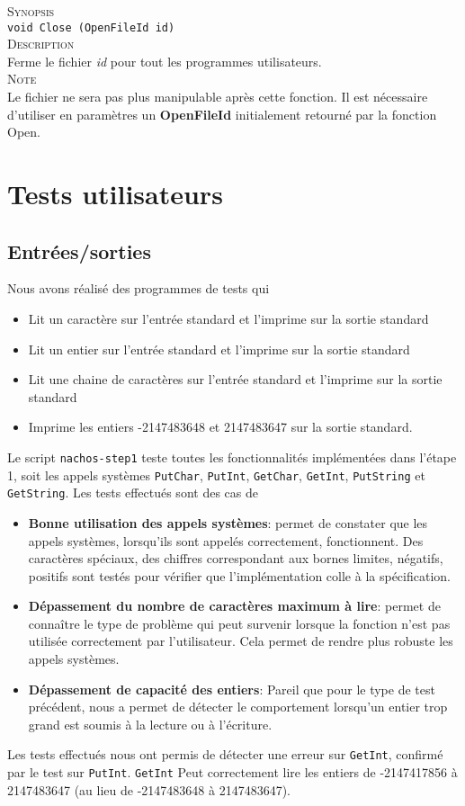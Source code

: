 \documentclass{report}
\begin{document}
\textsc{Synopsis}\\	
	\texttt{void Close (OpenFileId id)}\\
	
\textsc{Description}\\
	Ferme le fichier \textit{id} pour tout les programmes utilisateurs.  \\	
	
\textsc{Note}\\
	Le fichier ne sera pas plus manipulable après cette fonction. Il est nécessaire d'utiliser en paramètres un \textbf{OpenFileId} initialement retourné par la fonction Open.\\	
	
	
\section*{Tests utilisateurs}
\subsection*{Entrées/sorties}
Nous avons réalisé des programmes de tests qui
\begin{itemize}
 \item Lit un caractère sur l'entrée standard et l'imprime sur la sortie standard
 \item Lit un entier sur l'entrée standard et l'imprime sur la sortie standard
 \item Lit une chaine de caractères sur l'entrée standard et l'imprime sur la sortie
 standard
 \item Imprime les entiers -2147483648 et 2147483647 sur la sortie standard.
\end{itemize}
Le script \texttt{nachos-step1} teste toutes les fonctionnalités implémentées dans l'étape 1, soit les appels systèmes \texttt{PutChar}, \texttt{PutInt}, \texttt{GetChar}, \texttt{GetInt}, \texttt{PutString} et \texttt{GetString}.
Les tests effectués sont des cas de
\begin{itemize}
 \item \textbf{Bonne utilisation des appels systèmes}: permet de constater que les appels systèmes, lorsqu'ils sont appelés correctement, fonctionnent. Des caractères spéciaux, des chiffres correspondant aux bornes limites, négatifs, positifs sont testés pour vérifier que l'implémentation colle à la spécification.
 \item \textbf{Dépassement du nombre de caractères maximum à lire}: permet de connaître le type de problème qui peut survenir lorsque la fonction n'est pas utilisée correctement par l'utilisateur. Cela permet de rendre plus robuste les appels systèmes.
 \item \textbf{Dépassement de capacité des entiers}: Pareil que pour le type de test précédent, nous a permet de détecter le comportement lorsqu'un entier trop grand est soumis à la lecture ou à l'écriture.
\end{itemize}
Les tests effectués nous ont permis de détecter une erreur sur \texttt{GetInt}, confirmé par le test sur \texttt{PutInt}. \texttt{GetInt} Peut correctement lire les entiers de -2147417856 à 2147483647 (au lieu de -2147483648 à 2147483647).
\end{document}
